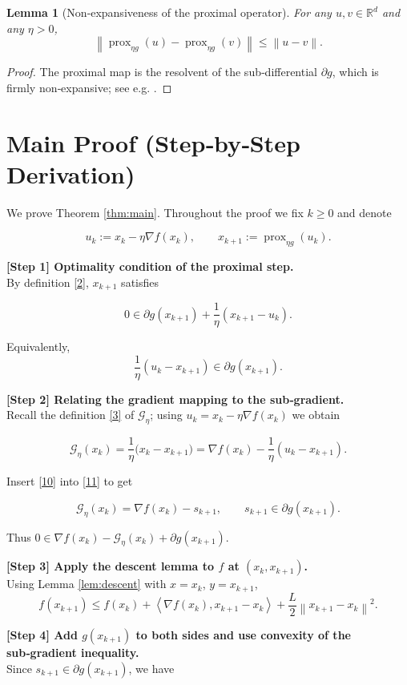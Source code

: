 \documentclass{article}
\newtheorem{lemma}{Lemma}
\newcommand{\prox}{\operatorname{prox}}
\newcommand{\grad}{\nabla}
\newcommand{\R}{\mathbb{R}}
\newcommand{\norm}[1]{\left\|#1\right\|}
\newcommand{\inner}[2]{\left\langle #1,#2\right\rangle}
\begin{document}
\begin{lemma}[Non‑expansiveness of the proximal operator]\label{lem:nonexp}
For any $u,v\in\R^{d}$ and any $\eta>0$,
\[
\norm{\prox_{\eta g}(u)-\prox_{\eta g}(v)}\le \norm{u-v}.
\tag{8}
\]
\end{lemma}
\begin{proof}
The proximal map is the resolvent of the sub‑differential $\partial g$, which is firmly non‑expansive; see e.g. \cite{proxbook}.
\end{proof}

\section*{Main Proof (Step‑by‑Step Derivation)}
We prove Theorem \ref{thm:main}. Throughout the proof we fix $k\ge0$ and denote  

\[
u_k:=x_k-\eta\grad f(x_k),\qquad
x_{k+1}:=\prox_{\eta g}(u_k).
\]

\noindent\textbf{[Step 1] Optimality condition of the proximal step.}\\
By definition \eqref{2}, $x_{k+1}$ satisfies  

\[
0\in \partial g(x_{k+1})+\frac{1}{\eta}(x_{k+1}-u_k).
\tag{9}
\]

Equivalently,
\[
\frac{1}{\eta}(u_k-x_{k+1})\in\partial g(x_{k+1}).
\tag{10}
\]

\noindent\textbf{[Step 2] Relating the gradient mapping to the sub‑gradient.}\\
Recall the definition \eqref{3} of $\mathcal{G}_{\eta}$; using $u_k=x_k-\eta\grad f(x_k)$ we obtain  

\[
\mathcal{G}_{\eta}(x_k)=\frac{1}{\eta}\bigl(x_k-x_{k+1}\bigr)
= \grad f(x_k)-\frac{1}{\eta}(u_k-x_{k+1}).
\tag{11}
\]

Insert \eqref{10} into \eqref{11} to get  

\[
\mathcal{G}_{\eta}(x_k)=\grad f(x_k)-s_{k+1},
\qquad s_{k+1}\in \partial g(x_{k+1}).
\tag{12}
\]

Thus $0\in \grad f(x_k)-\mathcal{G}_{\eta}(x_k)+\partial g(x_{k+1})$.

\noindent\textbf{[Step 3] Apply the descent lemma to $f$ at $(x_k,x_{k+1})$.}\\
Using Lemma \ref{lem:descent} with $x=x_k$, $y=x_{k+1}$,
\[
f(x_{k+1})\le f(x_k)+\inner{\grad f(x_k)}{x_{k+1}-x_k}
+\frac{L}{2}\norm{x_{k+1}-x_k}^{2}.
\tag{13}
\]

\noindent\textbf{[Step 4] Add $g(x_{k+1})$ to both sides and use convexity of the sub‑gradient inequality.}\\
Since $s_{k+1}\in\partial g(x_{k+1})$, we have  
\end{document}
